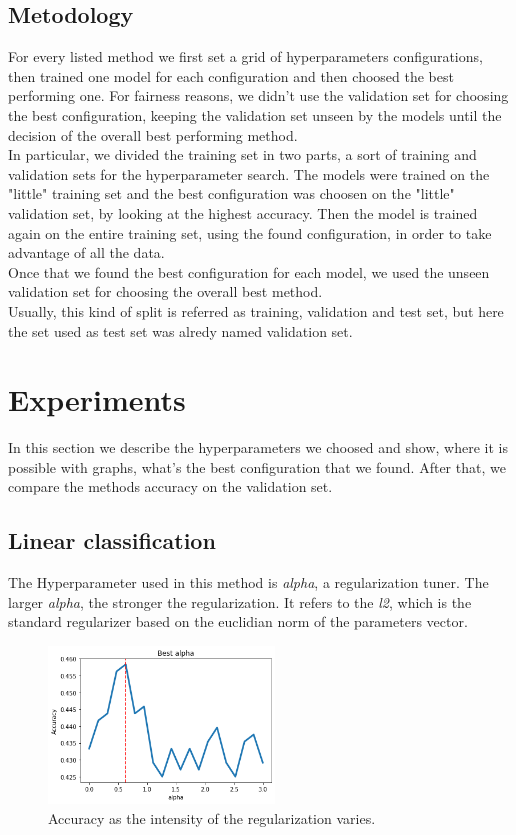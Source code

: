 \documentclass[10pt,twocolumn,letterpaper]{article}
\begin{document}
\subsection{Metodology}
For every listed method we first set a grid of hyperparameters configurations, then trained one model for each configuration and then choosed the best performing one. For fairness reasons, we didn't use the validation set for choosing the best configuration, keeping the validation set unseen by the models until the decision of the overall best performing method.\\ In particular, we divided the training set in two parts, a sort of training and validation sets for the hyperparameter search. The models were trained on the "little" training set and the best configuration was choosen on the "little" validation set, by looking at the highest accuracy.
Then the model is trained again on the entire training set, using the found configuration, in order to take advantage of all the data.\\
Once that we found the best configuration for each model, we used the unseen validation set for choosing the overall best method.\\ Usually, this kind of split is referred as training, validation and test set, but here the set used as test set was alredy named validation set.
\section{Experiments}
In this section we describe the hyperparameters we choosed and show, where it is possible with graphs, what's the best configuration that we found. After that, we compare the methods accuracy on the validation set.
\subsection{Linear classification}
The Hyperparameter used in this method is \textit{alpha}, a regularization tuner. The larger \textit{alpha}, the stronger the regularization. It refers to the \textit{l2}, which is the standard regularizer based on the euclidian norm of the parameters vector.
\begin{figure}[h!]
	\centering
	\includegraphics[width=6cm]{LC.png}
	\caption{Accuracy as the intensity of the regularization varies.}
	\label{LC.png}
\end{figure}
\medskip
\end{document}
